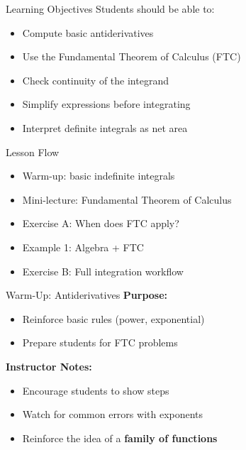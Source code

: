 \documentclass[dvipsnames]{beamer}
\begin{document}

\begin{frame}{Learning Objectives}
Students should be able to:
\begin{itemize}
\item Compute basic antiderivatives
\item Use the Fundamental Theorem of Calculus (FTC)
\item Check continuity of the integrand
\item Simplify expressions before integrating
\item Interpret definite integrals as net area
\end{itemize}
\end{frame}


\begin{frame}{Lesson Flow}
\begin{itemize}
\item Warm-up: basic indefinite integrals
\item Mini-lecture: Fundamental Theorem of Calculus
\item Exercise A: When does FTC apply?
\item Example 1: Algebra + FTC
\item Exercise B: Full integration workflow
\end{itemize}

\vspace{1em}

\end{frame}


\begin{frame}{Warm-Up: Antiderivatives}
\textbf{Purpose:}
\begin{itemize}
\item Reinforce basic rules (power, exponential)
\item Prepare students for FTC problems
\end{itemize}

\vspace{1em}

\textbf{Instructor Notes:}
\begin{itemize}
\item Encourage students to show steps
\item Watch for common errors with exponents
\item Reinforce the idea of a \textbf{family of functions}
\end{itemize}
\end{frame}
\end{document}
